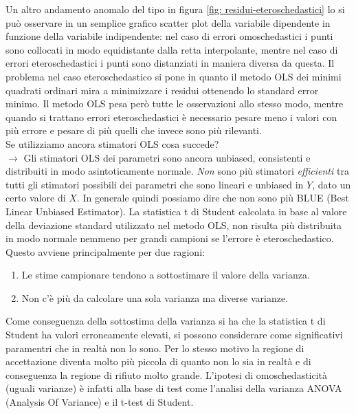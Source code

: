 Un altro andamento anomalo del tipo in figura \ref{fig: residui-eteroschedastici} lo si può osservare in un semplice grafico scatter plot della variabile dipendente in funzione della variabile indipendente: nel caso di errori omoschedastici i punti sono collocati in modo equidistante dalla retta interpolante, mentre nel caso di errori eteroschedastici i punti sono distanziati in maniera diversa da questa. Il problema nel caso eteroschedastico si pone in quanto il metodo OLS dei minimi quadrati ordinari mira a minimizzare i residui ottenendo lo standard error minimo. Il metodo OLS pesa però tutte le osservazioni allo stesso modo, mentre quando si trattano errori eteroschedastici è necessario pesare meno i valori con più errore e pesare di più quelli che invece sono più rilevanti.\\
Se utilizziamo ancora stimatori OLS cosa succede?\\
$\rightarrow$ Gli stimatori OLS dei parametri sono ancora unbiased, consistenti e distribuiti in modo asintoticamente normale. \textit{Non} sono più stimatori \textit{efficienti} tra tutti gli stimatori possibili dei parametri che sono lineari e unbiased in $Y$, dato un certo valore di $X$. In generale quindi possiamo dire che non sono più BLUE (Best Linear Unbiased Estimator).
La statistica t di Student calcolata in base al valore della deviazione standard utilizzato nel metodo OLS, non risulta più distribuita in modo normale nemmeno per grandi campioni se l'errore è eteroschedastico. Questo avviene principalmente per due ragioni:
\begin{enumerate}
	\item Le stime campionare tendono a sottostimare il valore della varianza.
	\item Non c'è più da calcolare una sola varianza ma diverse varianze.
\end{enumerate}
Come conseguenza della sottostima della varianza si ha che la statistica t di Student ha valori erroneamente elevati, si possono considerare come significativi paramentri che in realtà non lo sono. Per lo stesso motivo la regione di accettazione diventa molto più piccola di quanto non lo sia in realtà e di conseguenza la regione di rifiuto molto grande.
L'ipotesi di omoschedasticità (uguali varianze) è  infatti alla base di test come l'analisi della varianza ANOVA (Analysis Of Variance) e il t-test di Student.
